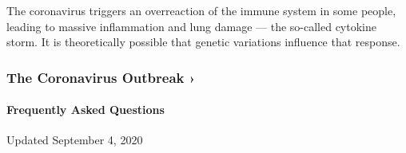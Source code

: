 The coronavirus triggers an overreaction of the immune system in some
people, leading to massive inflammation and lung damage --- the
so-called cytokine storm. It is theoretically possible that genetic
variations influence that response.

\href{https://www.nytimes3xbfgragh.onion/news-event/coronavirus?action=click\&pgtype=Article\&state=default\&region=MAIN_CONTENT_3\&context=storylines_faq}{}

\hypertarget{the-coronavirus-outbreak-}{%
\subsubsection{The Coronavirus Outbreak
›}\label{the-coronavirus-outbreak-}}

\hypertarget{frequently-asked-questions}{%
\paragraph{Frequently Asked
Questions}\label{frequently-asked-questions}}

Updated September 4, 2020

